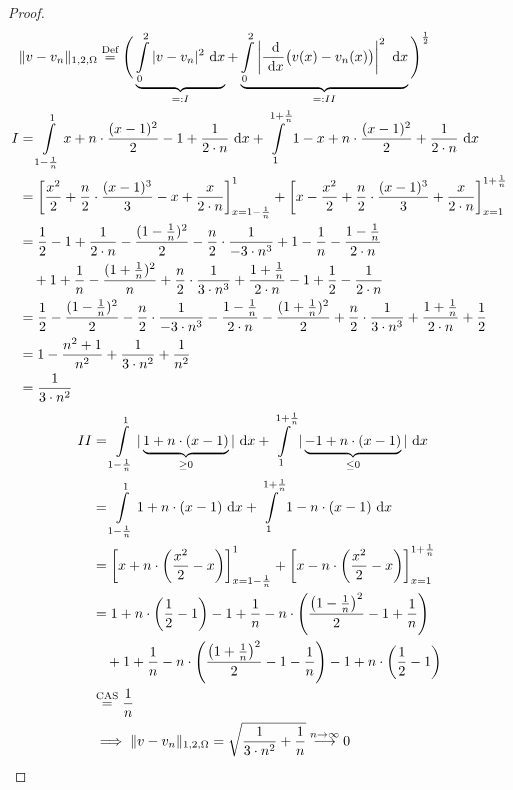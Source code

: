 \documentclass[12pt,a4paper]{article}
\begin{document}
\begin{proof}
\begin{align*}
&\Vert v-v_n\Vert_{1,2,\Omega}
\stackrel{\text{Def}}{=}
\Bigg(\underbrace{\int\limits_0^2|v -v_n|^2\text{ d} x}_{=:I}+\underbrace{\int\limits_0^2\left|\frac{\text{ d}}{\text{ d} x} \big(v(x)-v_n(x)\big)\right|^2\text{ d} x}_{=:II}\Bigg)^{\frac{1}{2}}\\
I&=\int\limits_{1-\frac{1}{n}}^1 x+n\cdot\frac{(x-1)^2}{2}-1+\frac{1}{2\cdot n}\text{ d} x+
\int\limits_1^{1+\frac{1}{n}}1-x+n\cdot\frac{(x-1)^2}{2}+\frac{1}{2\cdot n}\text{ d} x\\
&=\left[\frac{x^2}{2}+\frac{n}{2}\cdot\frac{(x-1)^3}{3}-x+\frac{x}{2\cdot n}\right]_{x=1-\frac{1}{n}}^1
+\left[x-\frac{x^2}{2}+\frac{n}{2}\cdot\frac{(x-1)^3}{3}+\frac{x}{2\cdot n}\right]_{x=1}^{1+\frac{1}{n}}\\
&=\frac{1}{2}-1+\frac{1}{2\cdot n}-\frac{(1-\frac{1}{n})^2}{2}-\frac{n}{2}\cdot\frac{1}{-3\cdot n^3}+1-\frac{1}{n}-\frac{1-\frac{1}{n}}{2\cdot n}\\
&~~~+1+\frac{1}{n}-\frac{(1+\frac{1}{n})^2}{n}+\frac{n}{2}\cdot\frac{1}{3\cdot n^3}+\frac{1+\frac{1}{n}}{2\cdot n}-1+\frac{1}{2}-\frac{1}{2\cdot n}\\
&=\frac{1}{2}-\frac{(1-\frac{1}{n})^2}{2}-\frac{n}{2}\cdot\frac{1}{-3\cdot n^3}-\frac{1-\frac{1}{n}}{2\cdot n}
-\frac{(1+\frac{1}{n})^2}{2}+\frac{n}{2}\cdot\frac{1}{3\cdot n^3}+\frac{1+\frac{1}{n}}{2\cdot n}+\frac{1}{2}\\
&=1-\frac{n^2+1}{n^2}+\frac{1}{3\cdot n^2}+\frac{1}{n^2}\\
&=\frac{1}{3\cdot n^2}
\end{align*}
\begin{align*}
II&=\int\limits_{1-\frac{1}{n}}^1 |\underbrace{1+n\cdot(x-1)}_{\geq0}|\text{ d} x+
\int\limits_1^{1+\frac{1}{n}}|\underbrace{-1+n\cdot(x-1)}_{\leq0}|\text{ d} x\\
&=\int\limits_{1-\frac{1}{n}}^1 1+n\cdot(x-1)\text{ d} x+
\int\limits_1^{1+\frac{1}{n}}1-n\cdot(x-1)\text{ d} x\\
&=\left[x+n\cdot\left(\frac{x^2}{2}-x\right)\right]_{x=1-\frac{1}{n}}^1+\left[x-n\cdot\left(\frac{x^2}{2}-x\right)\right]_{x=1}^{1+\frac{1}{n}}\\
&=1+n\cdot\left(\frac{1}{2}-1\right)-1+\frac{1}{n}-n\cdot\left(\frac{\left(1-\frac{1}{n}\right)^2}{2}-1+\frac{1}{n}\right)\\
&~~~+1+\frac{1}{n}-n\cdot\left(\frac{\left(1+\frac{1}{n}\right)^2}{2}-1-\frac{1}{n}\right)-1+n\cdot\left(\frac{1}{2}-1\right)\\
&\stackrel{\text{CAS}}{=}
\frac{1}{n}\\
&\implies\Vert v-v_n\Vert_{1,2,\Omega}=\sqrt{\frac{1}{3\cdot n^2}+\frac{1}{n}}
\stackrel{n\to\infty}{\longrightarrow}0
\end{align*}

\end{proof}
\end{document}
